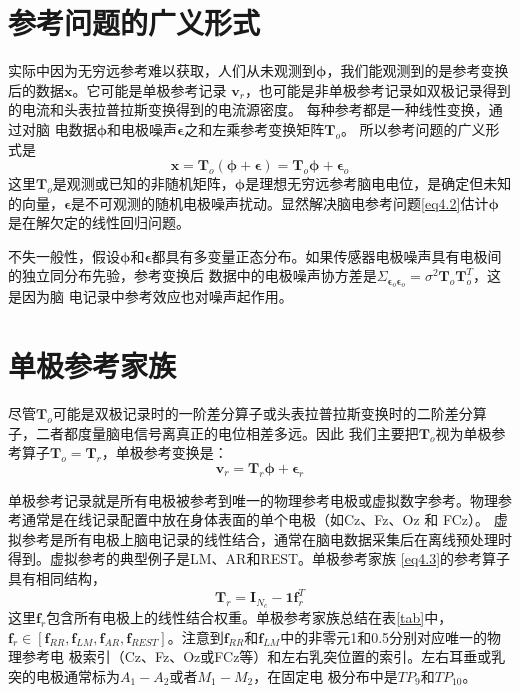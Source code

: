 \section{参考问题的广义形式}
实际中因为无穷远参考难以获取，人们从未观测到$\mathbf{\phi}$，我们能观测到的是参考变换后的数据$\mathbf{x}$。它可能是单极参考记录
$\mathbf{v}_r$，也可能是非单极参考记录如双极记录得到的电流和头表拉普拉斯变换得到的电流源密度。 每种参考都是一种线性变换，通过对脑
电数据$\mathbf{\phi}$和电极噪声$\mathbf{\epsilon}$之和左乘参考变换矩阵$\mathbf{T}_o$。 所以参考问题的广义形式是
\begin{equation}\label{eq4.2}
\mathbf{x}=\mathbf{T}_{o}(\mathbf{\phi+\epsilon})=\mathbf{T}_{o}\mathbf{\phi}+\mathbf{\epsilon}_o
\end{equation}
这里$\mathbf{T}_o$是观测或已知的非随机矩阵，$\mathbf{\phi}$是理想无穷远参考脑电电位，是确定但未知的向量，$\mathbf{\epsilon}$是不可观测的随机电极噪声扰动。显然解决脑电参考问题\eqref{eq4.2}估计$\mathbf{\phi}$是在解欠定的线性回归问题。 

不失一般性，假设$\mathbf{\phi}$和$\mathbf{\epsilon}$都具有多变量正态分布。如果传感器电极噪声具有电极间的独立同分布先验，参考变换后
数据中的电极噪声协方差是$\Sigma_{\mathbf{\epsilon}_o\mathbf{\epsilon}_o}=\sigma^2\mathbf{T}_{o}\mathbf{T}_{o}^T$，这是因为脑
电记录中参考效应也对噪声起作用。

\section{单极参考家族}
尽管$\mathbf{T}_{o}$可能是双极记录时的一阶差分算子或头表拉普拉斯变换时的二阶差分算子，二者都度量脑电信号离真正的电位相差多远。因此
我们主要把$\mathbf{T}_{o}$视为单极参考算子$\mathbf{T}_{o}=\mathbf{T}_{r}$，单极参考变换是：
\begin{equation}\label{eq4.3}
\mathbf{v}_{r}=\mathbf{T}_{r}\mathbf{\phi}+\mathbf{\epsilon}_r
\end{equation}

单极参考记录就是所有电极被参考到唯一的物理参考电极或虚拟数字参考。物理参考通常是在线记录配置中放在身体表面的单个电极（如Cz、Fz、Oz 和 FCz）。 虚拟参考是所有电极上脑电记录的线性结合，通常在脑电数据采集后在离线预处理时得到。虚拟参考的典型例子是LM、AR和REST。单极参考家族
\eqref{eq4.3}的参考算子具有相同结构，
\begin{equation}\label{eq4.4}
\mathbf{T}_{r}=\mathbf{I}_{N_c}-\mathbf{1f}_r^T
\end{equation}
这里$\mathbf{f}_r$包含所有电极上的线性结合权重。单极参考家族总结在表\ref{tab}中，$\mathbf{f}_r\in{[\mathbf{f}_{RR},\mathbf{f}_{LM},\mathbf{f}_{AR},\mathbf{f}_{REST}]}$。注意到$\mathbf{f}_{RR}$和$\mathbf{f}_{LM}$中的非零元1和0.5分别对应唯一的物理参考电
极索引（Cz、Fz、Oz或FCz等）和左右乳突位置的索引。左右耳垂或乳突的电极通常标为$A_1-A_2$或者$M_1-M_2$，在固定电
极分布中是$TP_9$和$TP_{10}$。

